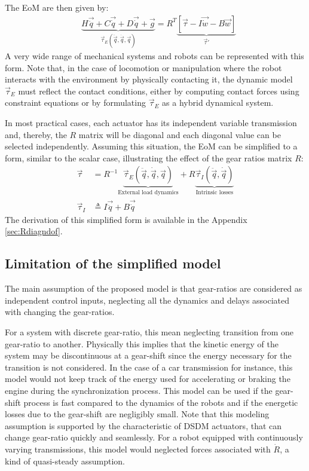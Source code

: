 The EoM are then given by:
%
\begin{align}
	&\underbrace{ H \vec{ \ddot{q} } + C\vec{ \dot{q} } + D \vec{ \dot{q} } + \vec{ g } }_{ \vec{\tau}_{E}(\ddot{\vec{q}},\dot{\vec{q}},\vec{q})}
		= R^T \underbrace{  \left[ 
		\vec{ \tau } - I \vec{ \dot{w} } - B \vec{ w }       
		\right]}_{ \vec{\tau}' } 
 \label{eq:eom_ndof}
\end{align}
%
A very wide range of mechanical systems and robots can be represented with this form. Note that, in the case of locomotion or manipulation where the robot interacts with the environment by physically contacting it, the dynamic model $\vec{\tau}_{E}$ must reflect the contact conditions, either by computing contact forces using constraint equations or by formulating $\vec{\tau}_{E}$ as a hybrid dynamical system.

In most practical cases, each actuator has its independent variable transmission and, thereby, the $R$ matrix will be diagonal and each diagonal value can be selected independently. Assuming this situation, the EoM can be simplified to a form, similar to the scalar case, illustrating the effect of the gear ratios matrix $R$: 
%
\begin{align}
	\vec{\tau} &= R^{-1} 
	\underbrace{ 
	\vec{\tau}_{E}(\ddot{\vec{q}},\dot{\vec{q}},\vec{q}) 
	}_{\text{External load dynamics}}
	+ R 
	\underbrace{ 
	\vec{\tau}_{I}(\ddot{\vec{q}},\dot{\vec{q}})
		}_{\text{Intrinsic losses}}
	\\ %
	\vec{\tau}_{I} &\triangleq I \vec{ \ddot{q} } + B \vec{ \dot{q} } 
 \label{eq:eom_ndof2}
\end{align}
%
The derivation of this simplified form is available in the Appendix \ref{sec:Rdiagndof}.

\subsection{Limitation of the simplified model}
\label{sec:limitation}
%
The main assumption of the proposed model is that gear-ratios are considered as independent control inputs, neglecting all the dynamics and delays associated with changing the gear-ratios. 

For a system with discrete gear-ratio, this mean neglecting transition from one gear-ratio to another. Physically this implies that the kinetic energy of the system may be discontinuous at a gear-shift since the energy necessary for the transition is not considered. In the case of a car transmission for instance, this model would not keep track of the energy used for accelerating or braking the engine during the synchronization process. This model can be used if the gear-shift process is fast compared to the dynamics of the robots and if the energetic losses due to the gear-shift are negligibly small. Note that this modeling assumption is supported by the characteristic of DSDM actuators, that can change gear-ratio quickly and seamlessly. For a robot equipped with continuously varying transmissions, this model would neglected forces associated with $\dot{R}$, a kind of quasi-steady assumption. 

